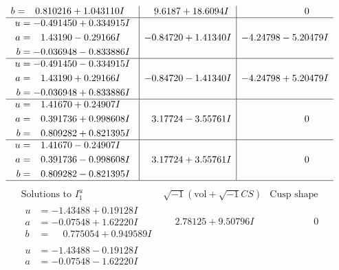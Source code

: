 \documentclass[1p]{elsarticle_modified}
\theoremstyle{definition}
\newcommand{\I}{\sqrt{-1}}
\begin{document}
$$\begin{array}{c|c|c}
\begin{aligned}
b &= \phantom{-}0.810216 + 1.043110 I\end{aligned}
 & \phantom{-}9.6187 + 18.6094 I & \phantom{-0.000000 } 0 \\ \hline\begin{aligned}
u &= -0.491450 + 0.334915 I \\
a &= \phantom{-}1.43190 - 0.29166 I \\
b &= -0.036948 - 0.833886 I\end{aligned}
 & -0.84720 + 1.41340 I & -4.24798 - 5.20479 I \\ \hline\begin{aligned}
u &= -0.491450 - 0.334915 I \\
a &= \phantom{-}1.43190 + 0.29166 I \\
b &= -0.036948 + 0.833886 I\end{aligned}
 & -0.84720 - 1.41340 I & -4.24798 + 5.20479 I \\ \hline\begin{aligned}
u &= \phantom{-}1.41670 + 0.24907 I \\
a &= \phantom{-}0.391736 + 0.998608 I \\
b &= \phantom{-}0.809282 + 0.821395 I\end{aligned}
 & \phantom{-}3.17724 - 3.55761 I & \phantom{-0.000000 } 0 \\ \hline\begin{aligned}
u &= \phantom{-}1.41670 - 0.24907 I \\
a &= \phantom{-}0.391736 - 0.998608 I \\
b &= \phantom{-}0.809282 - 0.821395 I\end{aligned}
 & \phantom{-}3.17724 + 3.55761 I & \phantom{-0.000000 } 0\\
 \hline 
 \end{array}$$\newpage$$\begin{array}{c|c|c}  
\text{Solutions to }I^u_{1}& \I (\text{vol} + \sqrt{-1}CS) & \text{Cusp shape}\\
 \hline 
\begin{aligned}
u &= -1.43488 + 0.19128 I \\
a &= -0.07548 + 1.62220 I \\
b &= \phantom{-}0.775054 + 0.949589 I\end{aligned}
 & \phantom{-}2.78125 + 9.50796 I & \phantom{-0.000000 } 0 \\ \hline\begin{aligned}
u &= -1.43488 - 0.19128 I \\
a &= -0.07548 - 1.62220 I \\

\end{aligned}
\end{array}$$
\end{document}
